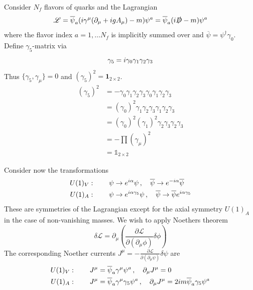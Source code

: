 Consider $N_f$ flavors of quarks and the Lagrangian
\begin{equation}
    \mathscr{L}=\overline{\psi}_a({i}\gamma^\mu(\partial_\mu+{i} gA_\mu)-m)\psi^a=\overline{\psi}_a({i}\slashed{D}-m)\psi^a
\end{equation}
where the flavor index $a=1,\dots N_f$ is implicitly summed over and $\overline{\psi}=\psi^\dagger\gamma_0$. Define $\gamma_5$-matrix via
\begin{equation}
    \gamma_5={i}\gamma_0\gamma_1\gamma_2\gamma_3
\end{equation}
Thus $\{\gamma_5,\gamma_\mu\}=0$ and $(\gamma_5)^2=\mathbf{1}_{2\times 2}$.
\begin{equation}
    \begin{split}
        (\gamma_5)^2&=-\gamma_0\gamma_1\gamma_2\gamma_3\gamma_0\gamma_1\gamma_2\gamma_3\\
        &=(\gamma_0)^2\gamma_1\gamma_2\gamma_3\gamma_1\gamma_2\gamma_3\\
        &=(\gamma_0)^2(\gamma_1)^2\gamma_2\gamma_3\gamma_2\gamma_3\\
        &=-\prod(\gamma_\mu)^2\\
        &=\mathbb{1}_{2\times 2}
    \end{split}
\end{equation}

Consider now the transformations
\begin{subequations}
    \begin{align}
        U(1)_V & :\qquad \psi\to e^{{i}\alpha}\psi\,,\quad\overline{\psi}\to e^{-{i}\alpha}\overline{\psi}               \\
        U(1)_A & :\qquad \psi\to e^{{i}\alpha\gamma_5}\psi\,,\quad\overline{\psi}\to\overline{\psi}e^{{i}\alpha\gamma_5}
    \end{align}
    \label{eq:ChiralSymmetry_U1VectorAxial}
\end{subequations}
These are symmetries of the Lagrangian except for the axial symmetry $U(1)_A$ in the case of non-vanishing masses. We wish to apply Noethers theorem
\begin{equation}
    \delta\mathscr{L}=\partial_\mu\left(\frac{\partial\mathscr{L}}{\partial(\partial_\mu\phi)}\delta\phi\right)
\end{equation}
The corresponding Noether currents $J^\mu=-\frac{\partial\mathscr{L}}{\partial(\partial_\mu\psi)}\delta\psi$ are
\begin{subequations}
    \begin{align}
        U(1)_V & :\qquad J^\mu=\overline{\psi}_a\gamma^\mu\psi^a\,,\quad\partial_\mu J^\mu=0                                                \\
        U(1)_A & :\qquad J^\mu=\overline{\psi}_a\gamma^\mu\gamma_5\psi^a\,,\quad\partial_\mu J^\mu=2{i} m\overline{\psi}_a\gamma_5\psi^a
    \end{align}
\end{subequations}

